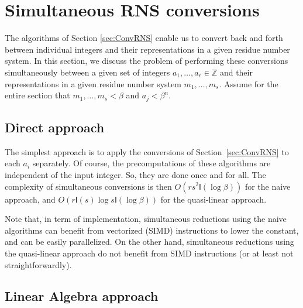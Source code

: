 \documentclass[acmtoms]{acmsmall}
\def\Z{\mathbb{Z}}
\def\I{\mathsf{I}}
\begin{document}


\section{Simultaneous RNS conversions}
\label{sec:simul-rns}

The algorithms of Section \ref{sec:ConvRNS} enable us to convert back and forth between individual 
integers and their representations in a given residue number system. In this section, we discuss 
the problem of performing these conversions simultaneously between a given set of integers $a_1, 
\ldots, a_r \in \Z$ and their representations in a given residue number system $m_1, \ldots, m_s$. 
Assume for the entire section that $m_1, \ldots, m_s < \beta$ and $a_j < \beta^n$. 

\subsection{Direct approach}

The simplest approach is to apply the conversions of Section~\ref{sec:ConvRNS} to each $a_i$ 
separately. Of course, the precomputations of these algorithms are independent of the input 
integer. So, they are done once and for all. The complexity of simultaneous conversions is then
$O(rs^2 \I (\log \beta))$ for the naive approach, and $O(r \I (s) \log s \I(\log \beta))$ for the 
quasi-linear approach.

Note that, in term of implementation, simultaneous reductions using the naive
algorithms can benefit from vectorized (SIMD) instructions to lower the constant,
and can be easily parallelized. On the other hand, simultaneous reductions using
the quasi-linear approach do not benefit from SIMD instructions (or at least not
straightforwardly).

\subsection{Linear Algebra approach}
\end{document}
